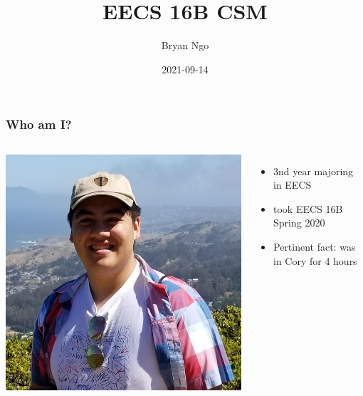 \documentclass[aspectratio=169]{beamer}
\title{EECS 16B CSM}
\author{Bryan Ngo}
\date{2021-09-14}
\institute{Computer Science Mentors}
\begin{document}
\begin{frame}
    \maketitle
\end{frame}

\begin{frame}
    \tableofcontents
\end{frame}

\begin{frame}
    \frametitle{Who am I?}

    \begin{columns}
        \includegraphics[width=0.8\textheight]{bryan_ngo.png}

        \begin{itemize}
            \item 3nd year majoring in EECS
            \item took EECS 16B Spring 2020
            \item Pertinent fact: was in Cory for 4 hours
        \end{itemize}
    \end{columns}
\end{frame}
\end{document}
